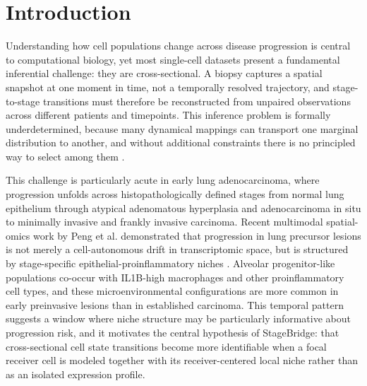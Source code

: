 \documentclass[conference]{IEEEtran}
\begin{document}
\section{Introduction}

Understanding how cell populations change across disease progression is central to computational biology, yet most single-cell datasets present a fundamental inferential challenge: they are cross-sectional. A biopsy captures a spatial snapshot at one moment in time, not a temporally resolved trajectory, and stage-to-stage transitions must therefore be reconstructed from unpaired observations across different patients and timepoints. This inference problem is formally underdetermined, because many dynamical mappings can transport one marginal distribution to another, and without additional constraints there is no principled way to select among them \cite{Weinreb2018-jq}.

This challenge is particularly acute in early lung adenocarcinoma, where progression unfolds across histopathologically defined stages from normal lung epithelium through atypical adenomatous hyperplasia and adenocarcinoma in situ to minimally invasive and frankly invasive carcinoma. Recent multimodal spatial-omics work by Peng et al. demonstrated that progression in lung precursor lesions is not merely a cell-autonomous drift in transcriptomic space, but is structured by stage-specific epithelial-proinflammatory niches \cite{Peng2025-xu}. Alveolar progenitor-like populations co-occur with IL1B-high macrophages and other proinflammatory cell types, and these microenvironmental configurations are more common in early preinvasive lesions than in established carcinoma. This temporal pattern suggests a window where niche structure may be particularly informative about progression risk, and it motivates the central hypothesis of StageBridge: that cross-sectional cell state transitions become more identifiable when a focal receiver cell is modeled together with its receiver-centered local niche rather than as an isolated expression profile.
\end{document}
